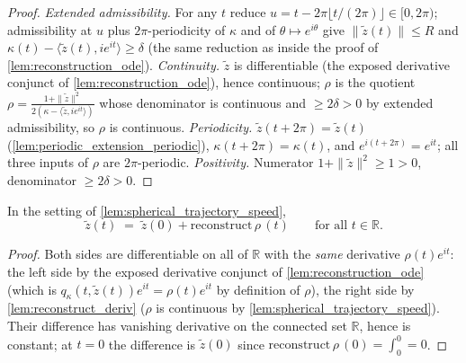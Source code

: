 \begin{proof}
  \leanok
  \emph{Extended admissibility.} For any $t$ reduce $u=t-2\pi\lfloor t/(2\pi)\rfloor
  \in[0,2\pi)$; admissibility at $u$ plus $2\pi$-periodicity of $\kappa$ and of
  $\theta\mapsto e^{i\theta}$ give $\|\tilde z(t)\|\le R$ and
  $\kappa(t)-\langle\tilde z(t),ie^{it}\rangle\ge\delta$ (the same reduction as inside
  the proof of \cref{lem:reconstruction_ode}).
  \emph{Continuity.} $\tilde z$ is differentiable (the exposed derivative conjunct of
  \cref{lem:reconstruction_ode}), hence continuous; $\rho$ is the quotient
  $\rho=\tfrac{1+\|\tilde z\|^2}{2(\kappa-\langle\tilde z,ie^{it}\rangle)}$ whose
  denominator is continuous and $\ge2\delta>0$ by extended admissibility, so $\rho$ is
  continuous.
  \emph{Periodicity.} $\tilde z(t+2\pi)=\tilde z(t)$
  (\cref{lem:periodic_extension_periodic}), $\kappa(t+2\pi)=\kappa(t)$, and
  $e^{i(t+2\pi)}=e^{it}$; all three inputs of $\rho$ are $2\pi$-periodic.
  \emph{Positivity.} Numerator $1+\|\tilde z\|^2\ge1>0$, denominator $\ge2\delta>0$.
\end{proof}

\begin{lemma}
  \label{lem:spherical_trajectory_eq_reconstruct}
  In the setting of \cref{lem:spherical_trajectory_speed},
  \[
    \tilde z(t)\;=\;\tilde z(0)+\mathrm{reconstruct}\,\rho\,(t)
    \qquad\text{for all } t\in\mathbb R .
  \]
\end{lemma}

\begin{proof}
  \leanok
  Both sides are differentiable on all of $\mathbb R$ with the \emph{same} derivative
  $\rho(t)e^{it}$: the left side by the exposed derivative conjunct of
  \cref{lem:reconstruction_ode} (which is $q_\kappa(t,\tilde z(t))e^{it}
  =\rho(t)e^{it}$ by definition of $\rho$), the right side by
  \cref{lem:reconstruct_deriv} ($\rho$ is continuous by
  \cref{lem:spherical_trajectory_speed}). Their difference has vanishing derivative on
  the connected set $\mathbb R$, hence is constant; at $t=0$ the difference is
  $\tilde z(0)$ since $\mathrm{reconstruct}\,\rho\,(0)=\int_0^0=0$.
\end{proof}

